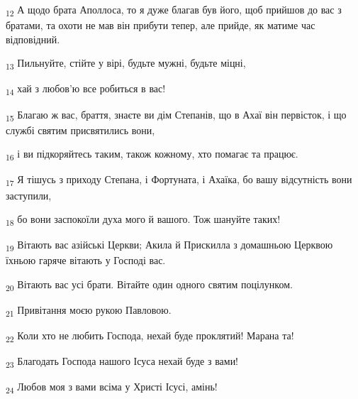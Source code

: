 \begin{tcolorbox}
\textsubscript{12} А щодо брата Аполлоса, то я дуже благав був його, щоб прийшов до вас з братами, та охоти не мав він прибути тепер, але прийде, як матиме час відповідний.
\end{tcolorbox}
\begin{tcolorbox}
\textsubscript{13} Пильнуйте, стійте у вірі, будьте мужні, будьте міцні,
\end{tcolorbox}
\begin{tcolorbox}
\textsubscript{14} хай з любов'ю все робиться в вас!
\end{tcolorbox}
\begin{tcolorbox}
\textsubscript{15} Благаю ж вас, браття, знаєте ви дім Степанів, що в Ахаї він первісток, і що службі святим присвятились вони,
\end{tcolorbox}
\begin{tcolorbox}
\textsubscript{16} і ви підкоряйтесь таким, також кожному, хто помагає та працює.
\end{tcolorbox}
\begin{tcolorbox}
\textsubscript{17} Я тішусь з приходу Степана, і Фортуната, і Ахаїка, бо вашу відсутність вони заступили,
\end{tcolorbox}
\begin{tcolorbox}
\textsubscript{18} бо вони заспокоїли духа мого й вашого. Тож шануйте таких!
\end{tcolorbox}
\begin{tcolorbox}
\textsubscript{19} Вітають вас азійські Церкви; Акила й Прискилла з домашньою Церквою їхньою гаряче вітають у Господі вас.
\end{tcolorbox}
\begin{tcolorbox}
\textsubscript{20} Вітають вас усі брати. Вітайте один одного святим поцілунком.
\end{tcolorbox}
\begin{tcolorbox}
\textsubscript{21} Привітання моєю рукою Павловою.
\end{tcolorbox}
\begin{tcolorbox}
\textsubscript{22} Коли хто не любить Господа, нехай буде проклятий! Марана та!
\end{tcolorbox}
\begin{tcolorbox}
\textsubscript{23} Благодать Господа нашого Ісуса нехай буде з вами!
\end{tcolorbox}
\begin{tcolorbox}
\textsubscript{24} Любов моя з вами всіма у Христі Ісусі, амінь!
\end{tcolorbox}
